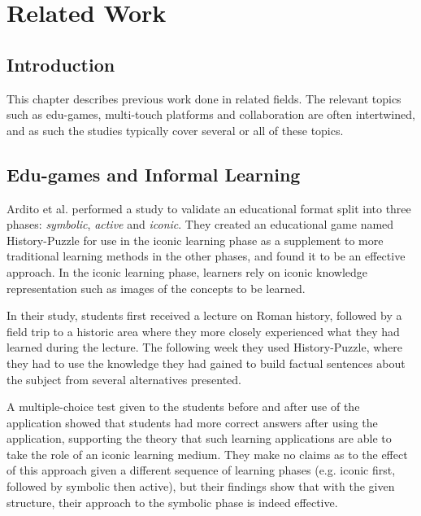 
\chapter{Related Work}

\label{Chapter2}



\section{Introduction}

This chapter describes previous work done in related fields. The relevant topics such as edu-games, multi-touch platforms and collaboration are often intertwined, and as such the studies typically cover several or all of these topics.


\section{Edu-games and Informal Learning}

Ardito et al.\citep{Ardito} performed a study to validate an educational format split into three phases: \emph{symbolic}, \emph{active} and \emph{iconic}. They created an educational game named History-Puzzle for use in the iconic learning phase as a supplement to more traditional learning methods in the other phases, and found it to be an effective approach. In the iconic learning phase, learners rely on iconic knowledge representation such as images of the concepts to be learned.

In their study, students first received a lecture on Roman history, followed by a field trip to a historic area where they more closely experienced what they had learned during the lecture. The following week they used History-Puzzle, where they had to use the knowledge they had gained to build factual sentences about the subject from several alternatives presented.

A multiple-choice test given to the students before and after use of the application showed that students had more correct answers after using the application, supporting the theory that such learning applications are able to take the role of an iconic learning medium. They make no claims as to the effect of this approach given a different sequence of learning phases (e.g. iconic first, followed by symbolic then active), but their findings show that with the given structure, their approach to the symbolic phase is indeed effective.

